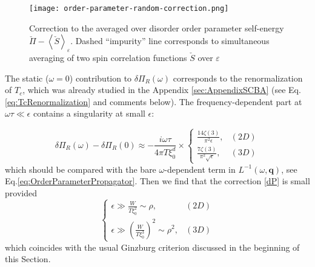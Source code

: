 \documentclass[twocolumn,english,prb]{revtex4-1}
\begin{document}
\begin{figure}
	\centering
	\texttt{[image: order-parameter-random-correction.png]}
	\caption{Correction to the averaged over disorder order parameter self-energy $\check{\Pi} - \left\langle\check{S}\right\rangle_{\varepsilon}$. Dashed ``impurity'' line corresponds to simultaneous averaging of two spin correlation functions $\check{S}$ over $\varepsilon$}
	\label{fig:OrderParameterRandomCorrection}
\end{figure}


The static ($\omega=0$) contribution to $\delta\Pi_R(\omega)$  corresponds to the renormalization of $T_c$, which was already studied in the Appendix \ref{sec:AppendixSCBA} (see Eq. \ref{eq:TcRenormalization} and comments below).  The frequency-dependent part at  $\omega \tau \ll \epsilon$ contains a singularity
at small $\epsilon$:

\begin{equation}
\label{dP}
\delta\Pi_R(\omega) - \delta\Pi_R(0) \approx -\frac{i\omega\tau}{4\pi T\xi_{0}^{d}}\times\begin{cases}
\frac{14\zeta(3)}{\pi^{2}\epsilon}, & (2D)\\
\frac{7\zeta(3)}{\pi^{2}\sqrt{\epsilon}}, & (3D)
\end{cases}
\end{equation}
which should be compared with the bare $\omega$-dependent term in $L^{-1}(\omega,\boldsymbol{q})$, see 
Eq.\eqref{eq:OrderParameterPropagator}.
Then we find that the correction  \eqref{dP} is small provided
\begin{equation}
\label{eq:FluctuationsApplicability}
\begin{cases}
\epsilon\gg\frac{W}{T\xi_{0}^{2}}\sim\rho, & (2D)\\
\epsilon\gg\left(\frac{W}{T\xi_{0}^{3}}\right)^{2}\sim\rho^{2}, & (3D)
\end{cases}
\end{equation} 
which coincides with the usual Ginzburg criterion discussed in the beginning of this Section.
\end{document}
